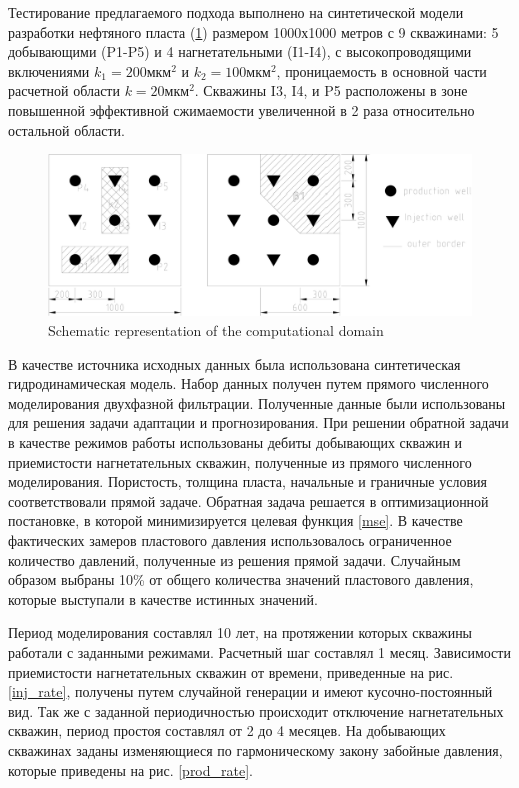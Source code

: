 \documentclass{article}
\begin{document}
Тестирование предлагаемого подхода выполнено на синтетической модели разработки нефтяного пласта (\ref{fig:schime}) размером 1000х1000 метров с 9 скважинами: 5 добывающими (P1-P5) и 4 нагнетательными (I1-I4), с высокопроводящими включениями $k_1 = 200 мкм^2$ и $k_2 = 100 мкм^2$, проницаемость в основной части расчетной области $k = 20 мкм^2$. Скважины I3, I4, и P5 расположены в зоне повышенной эффективной сжимаемости увеличенной в 2 раза относительно остальной области. 

\begin{figure}
	\centering
	\includegraphics[width=0.7\linewidth]{images/fig2.eps}
	\caption{Schematic representation of the computational domain}
	\label{fig:schime}
\end{figure}

В качестве источника исходных данных была использована синтетическая гидродинамическая модель. Набор данных получен путем прямого численного моделирования двухфазной фильтрации. Полученные данные были использованы для решения задачи адаптации и прогнозирования.
При решении обратной задачи в качестве режимов работы использованы дебиты добывающих скважин и приемистости нагнетательных скважин, полученные из прямого численного моделирования. Пористость, толщина пласта, начальные и граничные условия соответствовали прямой задаче. Обратная задача решается в оптимизационной постановке, в которой минимизируется целевая функция {\ref{mse}}. В качестве фактических замеров пластового давления использовалось ограниченное количество давлений, полученные из решения прямой задачи. Случайным образом выбраны 10\% от общего количества значений пластового давления, которые выступали в качестве истинных значений.

Период моделирования составлял 10 лет, на протяжении которых скважины работали с заданными режимами. Расчетный шаг составлял 1 месяц. Зависимости приемистости нагнетательных скважин от времени, приведенные на рис. \ref{inj_rate}, получены путем случайной генерации и имеют кусочно-постоянный вид. Так же с заданной периодичностью происходит отключение нагнетательных скважин, период простоя составлял от 2 до 4 месяцев. На добывающих скважинах заданы изменяющиеся по гармоническому закону забойные давления, которые приведены на рис. \ref{prod_rate}.
\end{document}
